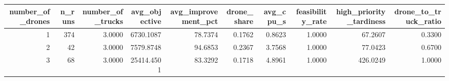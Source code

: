 \begin{tabular}{rrrrrrrrrr}
\toprule
number_of_drones & n_runs & number_of_trucks & avg_objective & avg_improvement_pct & drone_share & avg_cpu_s & feasibility_rate & high_priority_tardiness & drone_to_truck_ratio \\
\midrule
1 & 374 & 3.0000 & 6730.1087 & 78.7374 & 0.1762 & 0.8623 & 1.0000 & 67.2607 & 0.3300 \\
2 & 42 & 3.0000 & 7579.8748 & 94.6853 & 0.2367 & 3.7568 & 1.0000 & 77.0423 & 0.6700 \\
3 & 68 & 3.0000 & 25414.4501 & 83.3292 & 0.1718 & 4.8961 & 1.0000 & 426.0249 & 1.0000 \\
\bottomrule
\end{tabular}
